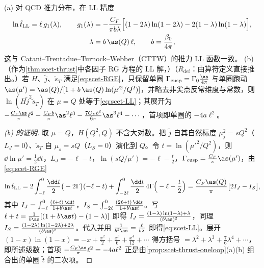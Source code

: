 \begin{proposition}\label{prop:scet-ll}
(a) 对 QCD 推力分布，在 LL 精度
\begin{equation}\label{eq:scet-LL}
\begin{gathered}
\ln\tilde t_{\rm LL}=\ell\,g_1(\lambda),\qquad g_1(\lambda)=-\frac{C_F}{\pi b\lambda}\Big[(1-2\lambda)\ln(1-2\lambda)-2(1-\lambda)\ln(1-\lambda)\Big],\\
\lambda=b\,\as(Q)\,\ell,\qquad b=\frac{\beta_0}{4\pi},
\end{gathered}
\end{equation}
这与 Catani--Trentadue--Turnock--Webber（CTTW）的推力 LL 函数一致\cite{CataniEtAl1993}。
(b)（作为\cref{thm:scet-thrust}中各因子 RG 方程的 LL 解，\tagR）（$R_{\mathrm{def}}$：由算符定义直接推出。）若 $H$、$\tilde j$、$\tilde s_T$ 满足\cref{eq:scet-RGE}，只保留单圈 $\Gamma_{\rm cusp}=\Gamma_0\frac{\as}{4\pi}$ 与单圈跑动 $\as(\mu')=\as(Q)/[1+b\,\as(Q)\ln(\mu'^2/Q^2)]$，并略去非尖点反常维度与常数，则 $\ln(H\tilde j^2\tilde s_T)$ 在 $\mu=Q$ 处等于\cref{eq:scet-LL}；其展开为 $-\frac{C_F\as}{\pi}\ell^2-\frac{C_Fb}{\pi}\as^2\ell^3-\frac{7C_Fb^2}{6\pi}\as^3\ell^4-\cdots$，首项即单圈的 $-4a\ell^2$。
\end{proposition}

\begin{proof}[(b) 的证明]
取 $\mu=Q$，$H(Q^2,Q)$ 不含大对数。把 $\tilde j$ 自其自然标度 $\mu_j^2=sQ^2$（$L_J=0$）、$\tilde s_T$ 自 $\mu_s=sQ$（$L_S=0$）演化到 $Q$。令 $t=\ln(\mu'^2/Q^2)$，则 $\dd\ln\mu'=\frac12\dd t$，$L_J=-\ell-t$，$\ln(sQ/\mu')=-\ell-\frac t2$，$\Gamma_{\rm cusp}=\frac{C_F}{\pi}\as(\mu')$，由\cref{eq:scet-RGE}
\[
\ln\tilde t_{\rm LL}=2\int_{-\ell}^{0}\frac{\dd t}{2}\big(-2\Gamma\big)(-\ell-t)+\int_{-2\ell}^{0}\frac{\dd t}{2}\,4\Gamma\Big(-\ell-\frac t2\Big)=\frac{C_F\as(Q)}{\pi}\big[2I_J-I_S\big],
\]
其中 $I_J=\int_{-\ell}^0\frac{(\ell+t)\,\dd t}{1+b\as t}$，$I_S=\int_{-2\ell}^0\frac{(2\ell+t)\,\dd t}{1+b\as t}$。写 $\ell+t=\frac{1}{b\as}[(1+b\as t)-(1-\lambda)]$ 即得 $I_J=\frac{(1-\lambda)\ln(1-\lambda)+\lambda}{(b\as)^2}$，同理 $I_S=\frac{(1-2\lambda)\ln(1-2\lambda)+2\lambda}{(b\as)^2}$。代入并用 $\frac1{b^2\as}=\frac{\ell}{b\lambda}$ 即得\cref{eq:scet-LL}。展开 $(1-x)\ln(1-x)=-x+\frac{x^2}2+\frac{x^3}6+\frac{x^4}{12}+\cdots$ 得方括号 $=\lambda^2+\lambda^3+\frac76\lambda^4+\cdots$，即所述级数；首项 $-\frac{C_F\as}\pi\ell^2=-4a\ell^2$ 正是由\cref{prop:scet-thrust-oneloop}(a)(b) 组合出的单圈 $\tilde t$ 的二次项。%
\end{proof}

